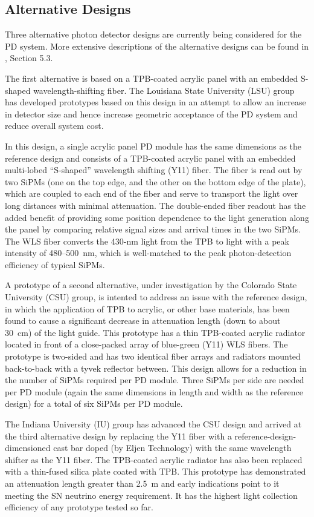 \subsection{Alternative Designs} 

Three alternative photon detector designs are currently being considered for the PD
system. More extensive descriptions of the alternative designs can be found in \anxlbnefd, Section 5.3.

The first alternative is based on a TPB-coated acrylic panel with an
embedded S-shaped wavelength-shifting fiber. The Louisiana State
University (LSU) group has developed prototypes based on this design
in an attempt to allow an increase in detector size and hence increase
geometric acceptance of the PD system and reduce overall system
cost.

In this design, a single acrylic panel PD module has the same
dimensions as the reference design and consists of a TPB-coated
acrylic panel with an embedded multi-lobed ``S-shaped'' wavelength
shifting (Y11) fiber. The fiber is read out by two SiPMs (one on the
top edge, and the other on the bottom edge of the plate), which are
coupled to each end of the fiber and serve to transport the light over
long distances with minimal attenuation. The double-ended fiber
readout has the added benefit of providing some position dependence to
the light generation along the panel by comparing relative signal
sizes and arrival times in the two SiPMs. The WLS fiber converts the
430-nm light from the TPB to light with a peak intensity of
480--500~nm, which is well-matched to the peak photon-detection
efficiency of typical SiPMs.

A prototype of a second alternative, under investigation by the Colorado
State University (CSU) group, is intented to address an issue with the reference
design, in which the application of TPB to acrylic, or other base
materials, has been found to cause a significant decrease in
attenuation length (down to about 30~cm) of the light guide.
%
This prototype has a thin TPB-coated acrylic radiator located in front
of a close-packed array of blue-green (Y11) WLS fibers.  The prototype
is two-sided and has two identical fiber arrays and radiators mounted
back-to-back with a tyvek reflector between. This design allows for a
reduction in the number of SiPMs required per PD module. Three SiPMs
per side are needed per PD module (again the same dimensions in length
and width as the reference design) for a total of six SiPMs per PD
module.

The Indiana University (IU) group has advanced the CSU design and
arrived at the third alternative design by replacing the Y11 fiber
with a reference-design-dimensioned cast bar doped (by Eljen
Technology) with the same wavelength shifter as the Y11 fiber. The
TPB-coated acrylic radiator has also been replaced with a thin-fused
silica plate coated with TPB. This prototype has demonstrated an
attenuation length greater than 2.5~m and early indications point to
it meeting the SN neutrino energy requirement. It has the highest
light collection efficiency of any prototype tested so far.

